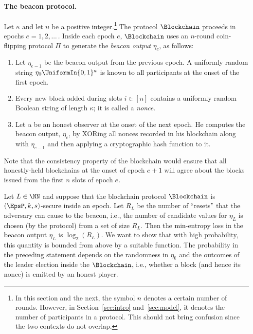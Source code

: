 \paragraph{The beacon protocol.}
Let $\kappa$ and let $n$ be a positive integer.\footnote{In this section and the next, 
the symbol $n$ denotes a certain number of rounds. 
However, 
in Section~\ref{sec:intro} and~\ref{sec:model}, 
it denotes the number of participants in a protocol. 
This should not bring confusion since 
the two contexts do not overlap.}
The protocol $\Blockchain$ 
proceeds in epochs $e = 1, 2, \ldots$\,. 
Inside each epoch $e$, 
$\Blockchain$ uses 
an $n$-round 
coin-flipping protocol $\Pi$ 
to generate the \emph{beacon output} $\eta_e$, as follows: 
\begin{enumerate}
  \item Let $\eta_{e-1}$ be the 
  beacon output from the previous epoch. 
  A uniformly random string $\eta_0 \UniformIn \{0,1\}^\kappa$ is known to all participants at the onset of the first epoch. 

  \item Every new block added during slots $i \in [n]$ contains 
  a uniformly random Boolean string of length $\kappa$; 
  it is called a \emph{nonce}.

  \item Let $u$ be an honest observer at the onset of the next epoch. 
  He computes the beacon output, $\eta_e$, 
  by XORing all nonces recorded in his blockchain 
  along with $\eta_{e-1}$ 
  and then applying a cryptographic hash function to it.
\end{enumerate}
Note that the consistency property of the blockchain 
would ensure that all honestly-held blockchains 
at the onset of epoch $e + 1$ 
will agree about the blocks issued from 
the first $n$ slots of epoch $e$.

Let $L \in \NN$ and suppose that 
the blockchain protocol $\Blockchain$ is $(\EpsP, k, s)$-secure 
inside an epoch. 
Let $R_L$ be the number of ``resets'' 
that the adversary can cause to the beacon, 
i.e., 
the number of candidate values for $\eta_L$ 
is chosen (by the protocol) 
from a set of size $R_L$. 
Then the min-entropy loss 
in the beacon output $\eta_L$ 
is $\log_2(R_L)$. 
We want to show that with high probability, 
this quantity is bounded from above by 
a suitable function. 
The probability in the preceding statement 
depends on 
the randomness in $\eta_0$ and 
the outcomes of the leader election inside the $\Blockchain$, 
i.e., whether a block (and hence its nonce) is emitted by an honest player.



